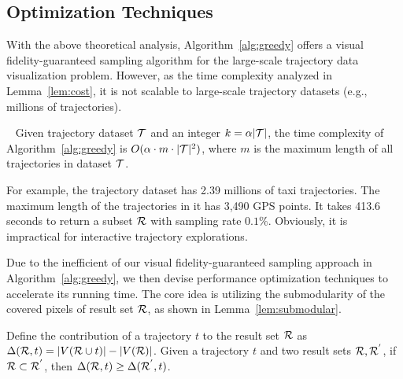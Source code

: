 \subsection{Optimization Techniques}\label{sec:opt}
With the above theoretical analysis, Algorithm~\ref{alg:greedy} offers a visual fidelity-guaranteed sampling algorithm for the large-scale trajectory data visualization problem.
However, as the time complexity analyzed in Lemma~\ref{lem:cost}, it is not scalable to large-scale trajectory datasets (e.g., millions of trajectories).

\begin{lemma}~\label{lem:cost}
Given trajectory dataset $\mathcal{T}$ and an integer $k = \alpha |\mathcal{T}|$, the time complexity of Algorithm~\ref{alg:greedy} is $O(\alpha \cdot m \cdot |\mathcal{T}|^2)$, where $m$ is the maximum length of all trajectories in dataset $\mathcal{T}$.
\end{lemma}


For example, the \pt{} trajectory dataset has 2.39 millions of taxi trajectories.
The maximum length of the trajectories in it has 3,490 GPS points.
It takes 413.6 seconds to return a subset $\mathcal{R}$ with sampling rate $0.1\%$.
Obviously, it is impractical for interactive trajectory explorations.

Due to the inefficient of our visual fidelity-guaranteed sampling approach in Algorithm~\ref{alg:greedy},
we then devise performance optimization techniques to accelerate its running time.
The core idea is utilizing the submodularity of the covered pixels of result set $\mathcal{R}$, as shown in Lemma~\ref{lem:submodular}.


\begin{lemma}[Submodularity]\label{lem:submodular}
Define the contribution of a trajectory $t$ to the result set $\mathcal{R}$ as $\Delta(\mathcal{R}, t) = |V(\mathcal{R} \cup t)| - |V(\mathcal{R})|$.
Given a trajectory $t$ and two result sets $\mathcal{R},\mathcal{R}^{'}$, if $\mathcal{R} \subset \mathcal{R}^{'}$, then $ \Delta(\mathcal{R}, t) \geq \Delta(\mathcal{R}^{'}, t)$.
\end{lemma}


